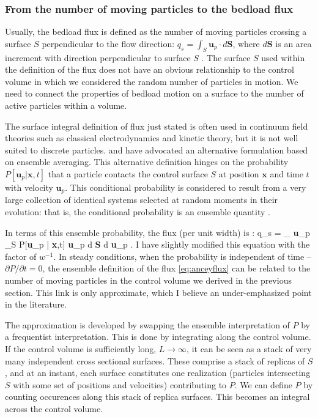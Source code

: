 \subsubsection{From the number of moving particles to the bedload flux}
\label{sec:fluxdef}
Usually, the bedload flux is defined as the number of moving particles crossing a surface $S$ perpendicular to the flow direction: $q_s = \int_S \textbf{u}_p \cdot d\textbf{S}$, where $d\textbf{S}$ is an area increment with direction perpendicular to surface $S$ \citep{Ballio2014}.  
The surface $S$ used within the definition of the flux does not have an obvious relationship to the control volume in which we considered the random number of particles in motion. 
We need to connect the properties of bedload motion on a surface to the number of active particles within a volume.  

The surface integral definition of flux just stated is often used in continuum field theories such as classical electrodynamics and kinetic theory, but it is not well suited to discrete particles. 
\citet{Ancey2006} and \citet{Furbish2012} have advocated an alternative formulation based on ensemble averaging. 
This alternative definition hinges on the probability $P[\textbf{u}_p | \textbf{x},t]$ that a particle contacts the control surface $S$ at position $\textbf{x}$ and time $t$ with velocity $\textbf{u}_p$. 
This conditional probability is considered to result from a very large collection of identical systems selected at random moments in their evolution: that is, the conditional probability is an ensemble quantity \citep{Kittel1958}.  

In terms of this ensemble probability, the flux (per unit width) is \citep{Ancey2006}: 
\be q_s = \int_{ \textbf{u}_p} \int_S P[\textbf{u}_p | \textbf{x},t] \textbf{u}_p \cdot d \textbf{S} d \textbf{u}_p . \label{eq:anceyflux} \ee
I have slightly modified this equation with the factor of $w^{-1}$. 
In steady conditions, when the probability is independent of time -- $\partial P / \partial t = 0$, the ensemble definition of the flux \ref{eq:anceyflux} can be related to the number of moving particles in the control volume we derived in the previous section. 
This link is only approximate, which I believe an under-emphasized point in the literature. 

The approximation is developed by swapping the ensemble interpretation of $P$ by a frequentist interpretation.
This is done by integrating along the control volume.  
If the control volume is sufficiently long, $L \rightarrow \infty$, it can be seen as a stack of very many independent cross sectional surfaces. 
These comprise a stack of replicas of $S$, and at an instant, each surface constitutes one realization (particles intersecting $S$ with some set of positions and velocities) contributing to $P$. 
We can define $P$ by counting occurences along this stack of replica surfaces. 
This becomes an integral across the control volume. 

